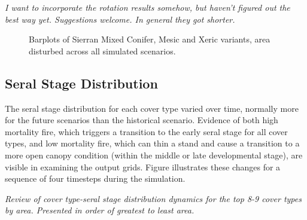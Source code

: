 \documentclass[12pt]{article}
\begin{document}
\begin{spacing}{1}
\emph{I want to incorporate the rotation results somehow, but haven't figured out the best way yet. Suggestions welcome. In general they got shorter.}

\begin{figure}[!htbp]
  \centering

    \caption{Barplots of Sierran Mixed Conifer, Mesic and Xeric variants, area disturbed across all simulated scenarios.}
  \label{fig:dareacomp_smc}
\end{figure}



\subsection*{Seral Stage Distribution}
The seral stage distribution for each cover type varied over time, normally more for the future scenarios than the historical scenario. Evidence of both high mortality fire, which triggers a transition to the early seral stage for all cover types, and low mortality fire, which can thin a stand and cause a transition to a more open canopy condition (within the middle or late developmental stage), are visible in examining the output grids. Figure  illustrates these changes for a sequence of four timesteps during the simulation.

\emph{Review of cover type-seral stage distribution dynamics for the top 8-9 cover types by area. Presented in order of greatest to least area.}



\end{spacing}
\end{document}
